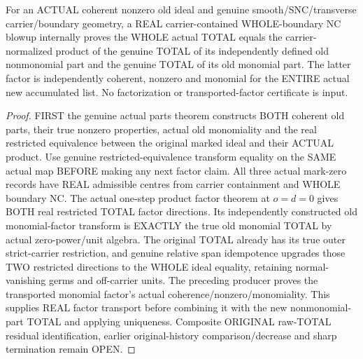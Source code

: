 \begin{theorem}
\label{hir:sharp-actual-original-parts-whole-total-factor-transport}
\leanok
For an ACTUAL coherent nonzero old ideal and genuine smooth/SNC/transverse
carrier/boundary geometry, a REAL carrier-contained WHOLE-boundary NC blowup
internally proves the WHOLE actual TOTAL equals the carrier-normalized
product of the genuine TOTAL of its independently defined old nonmonomial
part and the genuine TOTAL of its old monomial part. The latter factor is
independently coherent, nonzero and monomial for the ENTIRE actual new
accumulated list. No factorization or transported-factor certificate is input.
\end{theorem}
\begin{proof}
FIRST the genuine actual parts theorem constructs BOTH coherent old parts,
their true nonzero properties, actual old monomiality and the real restricted
equivalence between the original marked ideal and their ACTUAL product.
Use genuine restricted-equivalence transform equality on the SAME actual
map BEFORE making any next factor claim. All three actual mark-zero records
have REAL admissible centres from carrier containment and WHOLE boundary NC.
The actual one-step product factor theorem at $o=d=0$ gives BOTH real
restricted TOTAL factor directions. Its independently constructed old
monomial-factor transform is EXACTLY the true old monomial TOTAL by actual
zero-power/unit algebra. The original TOTAL already has its true outer
strict-carrier restriction, and genuine relative span idempotence upgrades
those TWO restricted directions to the WHOLE ideal equality, retaining
normal-vanishing germs and off-carrier units. The preceding producer proves
the transported monomial factor's actual coherence/nonzero/monomiality.
This supplies REAL factor transport before combining it with the new
nonmonomial-part TOTAL and applying uniqueness. Composite ORIGINAL raw-TOTAL
residual identification, earlier original-history comparison/decrease and
sharp termination remain OPEN.
\end{proof}

